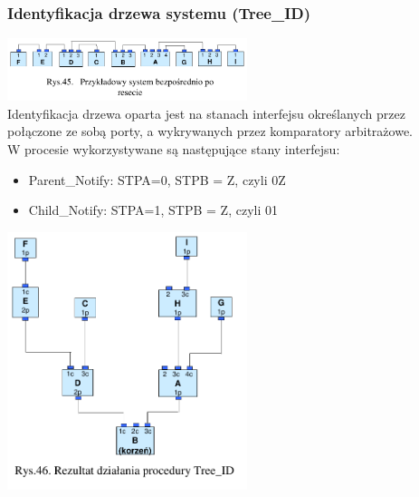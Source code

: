\subsubsection{Identyfikacja drzewa systemu (Tree\_ID)}
\includegraphics[width=7cm]{./wyklady/FIREWIRE_58_1.pdf}\\
Identyfikacja drzewa oparta jest na stanach interfejsu określanych przez połączone ze sobą porty, a wykrywanych przez komparatory arbitrażowe.\\
W procesie wykorzystywane są następujące stany interfejsu:
\begin{itemize}
	\item Parent\_Notify: STPA=0, STPB = Z, czyli 0Z
	\item Child\_Notify: STPA=1, STPB = Z, czyli 01
\end{itemize}
\includegraphics[width=7cm]{./wyklady/FIREWIRE_60_1.pdf}
